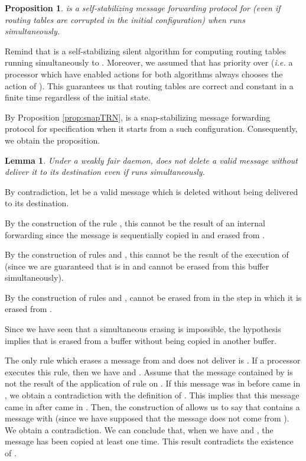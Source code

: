 \documentclass[11pt]{article}
\newtheorem{lemma}{Lemma}
\newtheorem{proposition}{Proposition}
\newenvironment{proof}{{\noindent\bf Proof. } }{{\hfill }}
\begin{document}
\begin{proposition} \label{prop:selfN}
\AN is a self-stabilizing message forwarding protocol for  (even if routing tables are corrupted in the initial configuration) when  runs simultaneously.
\end{proposition}

\begin{proof}
Remind that  is a self-stabilizing silent algorithm for computing routing tables running simultaneously to \AN. Moreover, we assumed that  has priority over \AN (\emph{i.e.} a processor which have enabled actions for both algorithms always chooses the action of ). This guarantees us that routing tables are correct and constant in a finite time regardless of the initial state. 

By Proposition \ref{prop:snapTRN}, \AN is a snap-stabilizing message forwarding protocol for specification  when it starts from a such configuration. Consequently, we obtain the proposition.
\end{proof}

\begin{lemma} \label{lem:perteN}
Under a weakly fair daemon, \AN does not delete a valid message without deliver it to its destination even if  runs simultaneously.
\end{lemma}

\begin{proof}
By contradiction, let  be a valid message which is deleted without being delivered to its destination.

By the construction of the rule , this cannot be the result of an internal forwarding since the message is sequentially copied in  and erased from .

By the construction of rules  and , this cannot be the result of the execution of  (since we are guaranteed that  is in  and cannot be erased from this buffer simultaneously).

By the construction of rules  and ,  cannot be erased from  in the step in which it is erased from .

Since we have seen that a simultaneous erasing is impossible, the hypothesis implies that  is erased from a buffer  without being copied in another buffer.

The only rule which erases a message from  and does not deliver  is . If a processor  executes this rule, then we have  and . Assume that the message contained by  is not the result of the application of rule  on . If this message was in  before  came in , we obtain a contradiction with
the definition of . This implies that this message came in  after  came in . Then, the construction of  allows us to say that  contains a message  with  (since we have supposed that the message does not come from ). We obtain a contradiction. We can conclude that, when we have  and , the message   has been copied at least one time. This result contradicts the existence of .
\end{proof}
\end{document}
